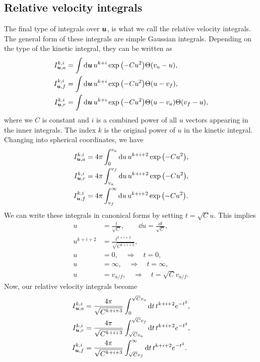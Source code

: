 \documentclass[aps,prl,preprint,groupedaddress,10pt]{revtex4-2}
\begin{document}
\subsection{Relative velocity integrals}
The final type of integrals over $\vb*{u}$, is what we call the relative velocity integrals. The general form
of these integrals are simple Gaussian integrals. Depending on the type of the kinetic integral,
they can be written as
\begin{equation}
    \begin{split}
        I_{\bu,a}^{k,i}&=\int\dd{\bu}u^{k+i}\exp\pqty{-Cu^2}\Theta\pqty{v_a-u},\\
        I_{\bu,f}^{k,i}&=\int\dd{\bu}u^{k+i}\exp\pqty{-Cu^2}\Theta\pqty{u-v_f},\\
        I_{\bu,r}^{k,i}&=\int\dd{\bu}u^{k+i}\exp\pqty{-Cu^2}\Theta\pqty{u-v_a}\Theta\pqty{v_f-u},
    \end{split}
\end{equation}
where we $C$ is constant and $i$ is a combined power of all $u$ vectors appearing in the inner integrals.
The index $k$ is the original power of $u$ in the kinetic integral. Changing into spherical coordinates,
we have
\begin{equation}
    \begin{split}
        I_{\bu,a}^{k,i}&=4\pi\int_{0}^{v_a}\dd{u}u^{k+i+2}\exp\pqty{-Cu^2},\\
        I_{\bu,r}^{k,i}&=4\pi\int_{v_a}^{v_f}\dd{u}u^{k+i+2}\exp\pqty{-Cu^2},\\
        I_{\bu,f}^{k,i}&=4\pi\int_{v_f}^{\infty}\dd{u}u^{k+i+2}\exp\pqty{-Cu^2}.
    \end{split}
\end{equation}
We can write these integrals in canonical forms by setting $t=\sqrt{C}u$. This implies
\begin{equation}
    \begin{split}
        u&=\frac{t}{\sqrt{C}},\qquad\dd{u}=\frac{\dd{t}}{\sqrt{C}},\\
        u^{k+i+2}&=\frac{t^{k+i+2}}{\sqrt{C^{k+i+2}}},\\
        u&=0,\quad\Rightarrow\quad t=0,\\
        u&=\infty,\quad\Rightarrow\quad t=\infty,\\
        u&=v_{a/f},\quad\Rightarrow\quad t=\sqrt{C}v_{a/f}.
    \end{split}
\end{equation}
Now, our relative velocity integrals become
\begin{equation}
    \begin{split}
        I_{\vb*{u},a}^{k,i}&=\frac{4\pi}{\sqrt{C^{k+i+3}}}\int_{0}^{\sqrt{C}v_a}\dd{t}t^{k+i+2}e^{-t^2},\\
        I_{\vb*{u},r}^{k,i}&=\frac{4\pi}{\sqrt{C^{k+i+3}}}\int_{\sqrt{C}v_a}^{\sqrt{C}v_f}
        \dd{t}t^{k+i+2}e^{-t^2},\\
        I_{\vb*{u},f}^{k,i}&=\frac{4\pi}{\sqrt{C^{k+i+3}}}\int_{\sqrt{C}v_f}^{\infty}\dd{t}t^{k+i+2}e^{-t^2}.
    \end{split}
\end{equation}
\end{document}
